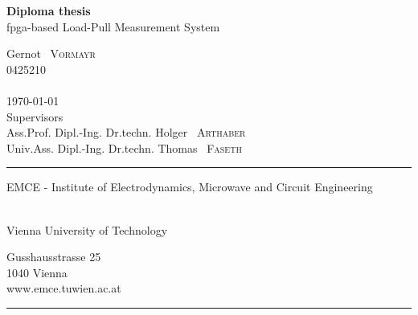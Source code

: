 \documentclass[12pt,a4paper,parskip=full,abstract=true,BCOR=10mm,twoside,open=right]{scrreprt}
\begin{document}
\begin{titlepage}
    \enlargethispage{1cm}
    \centering
    \vspace*{5cm}
    {\Huge \textbf{Diploma thesis}}\\
    \vspace*{1cm}
    {\Large \Gls{fpga}-based Load-Pull Measurement System}

    \vspace*{2cm}
    {\large Gernot ~\textsc{Vormayr} \\ 0425210 \\ } ~\\ 

    \vspace*{2cm}
    {\today } ~\\ 

    \vfill
    {Supervisors} ~\\\vspace*{0.1cm}
    {Ass.Prof. Dipl.-Ing. Dr.techn. \large Holger ~\textsc{Arthaber}} ~\\
    {Univ.Ass. Dipl.-Ing. Dr.techn. \large Thomas ~\textsc{Faseth}}
    \vspace*{2cm}

    \rule{\linewidth}{0.4pt}
    \begin{minipage}[t]{0.55\linewidth}
        \flushleft
        \begin{large}
            EMCE - Institute of Electrodynamics, Microwave and Circuit Engineering
        \end{large}\\
        Vienna University of Technology
    \end{minipage}
    \hfill
    \begin{minipage}[t]{0.27\linewidth}
        \flushright
        Gusshausstrasse 25\\
        1040 Vienna\\
        www.emce.tuwien.ac.at
    \end{minipage}
    \vspace*{-3pt}
    \rule{\linewidth}{0.4pt}
    \clearpage
\end{titlepage}

\begin{abstract}
    \lipsum[1-5]
\end{abstract}

\begin{otherlanguage}{ngerman}
\begin{abstract}
    \lipsum[1-5]
\end{abstract}
\end{otherlanguage}
\end{document}
